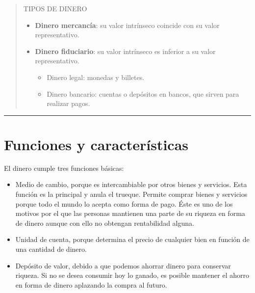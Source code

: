 \documentclass[
]{krantz}
\providecommand{\tightlist}{%
  \setlength{\itemsep}{0pt}\setlength{\parskip}{0pt}}
\begin{document}
\begin{quote}
TIPOS DE DINERO

\begin{itemize}
\tightlist
\item
  \textbf{Dinero mercancía}: su valor intrínseco coincide con su valor
  representativo.\\
\item
  \textbf{Dinero fiduciario}: su valor intrínseco es inferior a su valor representativo.

  \begin{itemize}
  \tightlist
  \item
    Dinero legal: monedas y billetes.\\
  \item
    Dinero bancario: cuentas o depósitos en bancos, que
    sirven para realizar pagos.
  \end{itemize}
\end{itemize}
\end{quote}

\begin{center}\rule{0.5\linewidth}{0.5pt}\end{center}

\hypertarget{funciones-y-caracteruxedsticas}{%
\section{Funciones y características}\label{funciones-y-caracteruxedsticas}}

El dinero cumple tres funciones básicas:

\begin{itemize}
\tightlist
\item
  Medio de cambio, porque es intercambiable por otros bienes y servicios. Esta función es la principal y anula el trueque. Permite comprar bienes y servicios porque todo el mundo lo acepta como forma de pago. Éste es uno de los motivos por el que las personas mantienen una parte de su riqueza en forma de dinero aunque con ello no obtengan rentabilidad alguna.
\item
  Unidad de cuenta, porque determina el precio de cualquier bien en función de una cantidad de dinero.
\item
  Depósito de valor, debido a que podemos ahorrar dinero para conservar riqueza. Si no se desea consumir hoy lo ganado, es posible mantener el ahorro en forma de dinero aplazando la compra al futuro.
\end{itemize}
\end{document}
